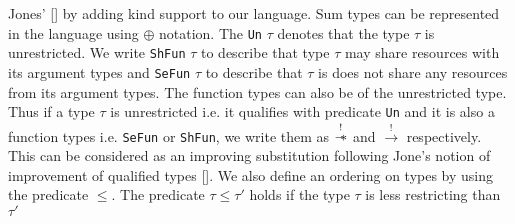 Jones' [\cite{jones_system_1993}] by adding kind support to our language. Sum types can be represented
in the language using $\oplus$ notation.
The \texttt{Un} $\tau$ denotes that the type $\tau$ is unrestricted.
We write \texttt{ShFun} $\tau$ to describe that type $\tau$ may share resources with its
argument types and \texttt{SeFun} $\tau$ to describe that $\tau$ is
does not share any resources from its argument types. The function types can also be of the unrestricted type.
Thus if a type $\tau$ is unrestricted i.e. it qualifies with predicate \texttt{Un} and it is also a function types
i.e. \texttt{SeFun} or \texttt{ShFun}, we write them as $\overset{!}{\mathrel{-\mkern-6mu*}}$ and $\xrightarrow{!}$ respectively.
This can be considered as an improving substitution following Jone's notion of improvement of qualified types [\cite{jones_simplifying_1995}].
We also define an ordering on types by using the predicate $\leq$. The predicate $\tau \leq \tau'$ holds if the type $\tau$
is less restricting than $\tau'$

